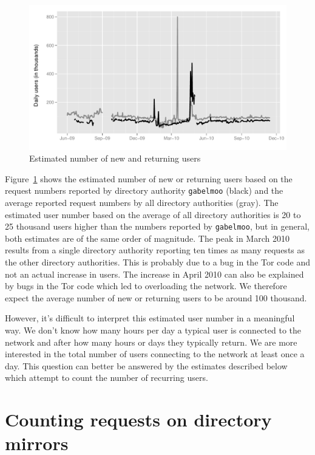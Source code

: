 \documentclass{article}
\begin{document}
\begin{figure}[t]
\includegraphics[width=\textwidth]{newusers.pdf}
\caption{Estimated number of new and returning users}
\label{fig:newusers}
\end{figure}

Figure~\ref{fig:newusers} shows the estimated number of new or returning
users based on the request numbers reported by directory authority
\texttt{gabelmoo} (black) and the average reported request numbers by all
directory authorities (gray).
The estimated user number based on the average of all directory
authorities is 20 to 25 thousand users higher than the numbers reported
by \texttt{gabelmoo}, but in general, both estimates are of the same order
of magnitude.
The peak in March 2010 results from a single directory authority reporting
ten times as many requests as the other directory authorities.
This is probably due to a bug in the Tor code and not an actual increase in
users.
The increase in April 2010 can also be explained by bugs in the Tor code
which led to overloading the network.
We therefore expect the average number of new or returning users to be
around 100 thousand.

However, it's difficult to interpret this estimated user number in a
meaningful way.
We don't know how many hours per day a typical user is connected to the
network and after how many hours or days they typically return.
We are more interested in the total number of users connecting to the
network at least once a day.
This question can better be answered by the estimates described below
which attempt to count the number of recurring users.

\section{Counting requests on directory mirrors}
\label{sec:current}
\end{document}
